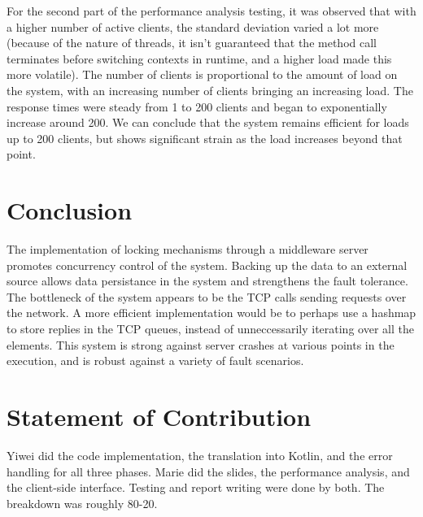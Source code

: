\documentclass[letterpaper,12pt]{article}
\begin{document}
	For the second part of the performance analysis testing, it was observed that with a higher number of active clients, the standard deviation varied a lot more (because of the nature of threads, it isn't guaranteed that the method call terminates before switching contexts in runtime, and a higher load made this more volatile). The number of clients is proportional to the amount of load on the system, with an increasing number of clients bringing an increasing load. The response times were steady from 1 to 200 clients and began to exponentially increase around 200. We can conclude that the system remains efficient for loads up to 200 clients, but shows significant strain as the load increases beyond that point.
	
	\section{Conclusion}
	
	The implementation of locking mechanisms through a middleware server promotes concurrency control of the system. Backing up the data to an external source allows data persistance in the system and strengthens the fault tolerance. The bottleneck of the system appears to be the TCP calls sending requests over the network. A more efficient implementation would be to perhaps use a hashmap to store replies in the TCP queues, instead of unneccessarily iterating over all the elements. This system is strong against server crashes at various points in the execution, and is robust against a variety of fault scenarios.
	
	\section{Statement of Contribution}
	Yiwei did the code implementation, the translation into Kotlin, and the error handling for all three phases. Marie did the slides, the performance analysis, and the client-side interface. Testing and report writing were done by both. The breakdown was roughly 80-20. 
	
\end{document}
